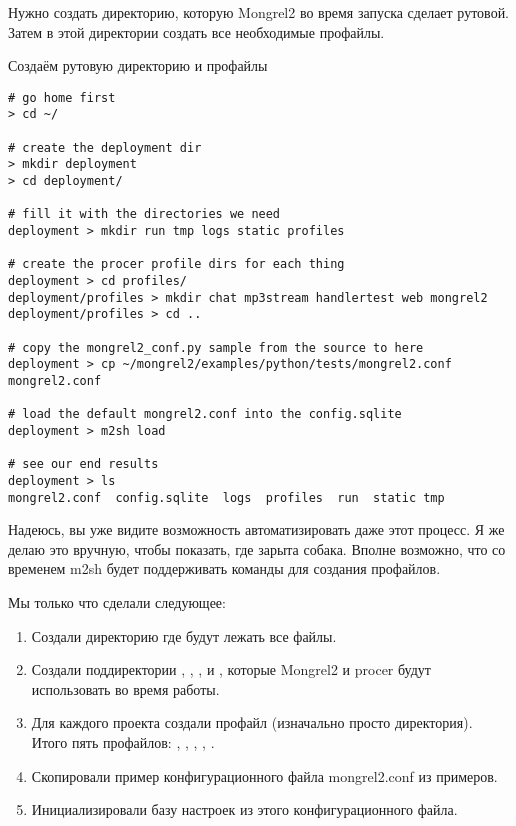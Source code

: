 Нужно создать директорию, которую Mongrel2 во время запуска сделает рутовой.
Затем в этой директории создать все необходимые профайлы.

\begin{code}{Создаём рутовую директорию и профайлы}
\begin{lstlisting}
# go home first
> cd ~/

# create the deployment dir
> mkdir deployment
> cd deployment/

# fill it with the directories we need
deployment > mkdir run tmp logs static profiles

# create the procer profile dirs for each thing
deployment > cd profiles/
deployment/profiles > mkdir chat mp3stream handlertest web mongrel2
deployment/profiles > cd ..

# copy the mongrel2_conf.py sample from the source to here
deployment > cp ~/mongrel2/examples/python/tests/mongrel2.conf mongrel2.conf

# load the default mongrel2.conf into the config.sqlite
deployment > m2sh load

# see our end results
deployment > ls
mongrel2.conf  config.sqlite  logs  profiles  run  static tmp

\end{lstlisting}
\end{code}

Надеюсь, вы уже видите возможность автоматизировать даже этот процесс. Я же
делаю это вручную, чтобы показать, где зарыта собака. Вполне возможно, что со
временем m2sh будет поддерживать команды для создания профайлов.

Мы только что сделали следующее:

\begin{enumerate}
  \item Создали директорию  где будут лежать все файлы.
  \item Создали поддиректории , , , и
    , которые Mongrel2 и procer будут использовать во время работы.
  \item Для каждого проекта создали профайл (изначально просто директория). Итого
    пять профайлов: , , , ,
    .
  \item Скопировали пример конфигурационного файла mongrel2.conf из примеров.
  \item Инициализировали базу настроек  из этого конфигурационного файла.
\end{enumerate}


